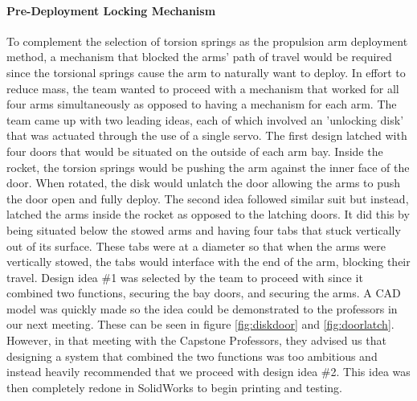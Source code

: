 \paragraph{Pre-Deployment Locking Mechanism}
\label{pre-deployment_arm}
To complement the selection of torsion springs as the propulsion arm deployment method, a mechanism that blocked the arms' path of travel would be required since the torsional springs cause the arm to naturally want to deploy. In effort to reduce mass, the team wanted to proceed with a mechanism that worked for all four arms simultaneously as opposed to having a mechanism for each arm. The team came up with two leading ideas, each of which involved an 'unlocking disk' that was actuated through the use of a single servo. The first design latched with four doors that would be situated on the outside of each arm bay. Inside the rocket, the torsion springs would be pushing the arm against the inner face of the door. When rotated, the disk would unlatch the door allowing the arms to push the door open and fully deploy. The second idea followed similar suit but instead, latched the arms inside the rocket as opposed to the latching doors. It did this by being situated below the stowed arms and having four tabs that stuck vertically out of its surface. These tabs were at a diameter so that when the arms were vertically stowed, the tabs would interface with the end of the arm, blocking their travel. Design idea \#1 was selected by the team to proceed with since it combined two functions, securing the bay doors, and securing the arms. A CAD model was quickly made so the idea could be demonstrated to the professors in our next meeting. These can be seen in figure \ref{fig:diskdoor} and \ref{fig:doorlatch}. However, in that meeting with the Capstone Professors, they advised us that designing a system that combined the two functions was too ambitious and instead heavily recommended that we proceed with design idea \#2. This idea was then completely redone in SolidWorks to begin printing and testing.

